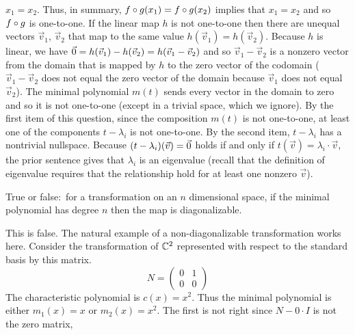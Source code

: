 \begin{exercises}
\begin{answer}
\begin{exparts}
          $x_1=x_2$.
          Thus, in summary, $f\mathbin\circ g(x_1)=f\mathbin\circ g(x_2)$
          implies that $x_1=x_2$ and so $f\mathbin\circ g$ is one-to-one.
        \partsitem If the linear map $h$ 
          is not one-to-one then there are unequal
          vectors $\vec{v}_1$, $\vec{v}_2$ that map to the same value
          $h(\vec{v}_1)=h(\vec{v}_2)$.
          Because $h$ is linear, we have
          $\vec{0}=h(\vec{v}_1)-h(\vec{v}_2)=h(\vec{v}_1-\vec{v}_2)$
          and so $\vec{v}_1-\vec{v}_2$ is a nonzero vector from the domain
          that is mapped by $h$ to the zero vector of the codomain  
          ($\vec{v}_1-\vec{v}_2$
          does not equal the zero vector of the domain because $\vec{v}_1$
          does not equal $\vec{v}_2$).
        \partsitem The minimal polynomial 
          $m(t)$ sends every vector in the domain to 
          zero and so it is not one-to-one (except in a trivial space, which 
          we ignore).
          By the first item of this question, 
          since the composition $m(t)$ is not one-to-one, 
          at least one of the components $t-\lambda_i$ is not one-to-one.
          By the second item, $t-\lambda_i$ has a nontrivial nullspace.
          Because $(t-\lambda_i)(\vec{v})=\vec{0}$ holds if and only if
          $t(\vec{v})=\lambda_i\cdot\vec{v}$, the prior sentence gives that
          $\lambda_i$ is an eigenvalue (recall that the definition of
          eigenvalue requires that the relationship hold for at least one
          nonzero $\vec{v}$).
      \end{exparts}
    \end{answer}
  \item 
    True or false:~for a transformation on an
    \( n \) dimensional space, if the minimal polynomial has degree \( n \) 
    then the map is diagonalizable.
    \begin{answer}
      This is false.
      The natural example of a non-diagonalizable transformation works here.
      Consider the transformation of $\mathbb{C}^2$ represented with respect to
      the standard basis by this matrix.
      \begin{equation*}
        N=
        \begin{pmatrix}
          0  &1  \\
          0  &0
        \end{pmatrix}
      \end{equation*}
      The characteristic polynomial is $c(x)=x^2$. 
      Thus the minimal polynomial is either $m_1(x)=x$ or $m_2(x)=x^2$.
      The first is not right since $N-0\cdot I$ is not the zero matrix,

\end{answer}
\end{exercises}
